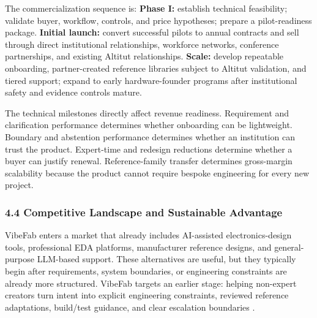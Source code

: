 \documentclass[11pt,letterpaper]{article}
\begin{document}
The commercialization sequence is: 
\textbf{Phase I:} establish technical feasibility; validate buyer, workflow, controls, and price hypotheses; prepare a pilot-readiness package.
\textbf{Initial launch:} convert successful pilots to annual contracts and sell through direct institutional relationships, workforce networks, conference partnerships, and existing Altitut relationships.
\textbf{Scale:} develop repeatable onboarding, partner-created reference libraries subject to Altitut validation, and tiered support; expand to early hardware-founder programs after institutional safety and evidence controls mature.

The technical milestones directly affect revenue readiness. Requirement and clarification performance determines whether onboarding can be lightweight. Boundary and abstention performance determines whether an institution can trust the product. Expert-time and redesign reductions determine whether a buyer can justify renewal. Reference-family transfer determines gross-margin scalability because the product cannot require bespoke engineering for every new project.

\subsubsection*{4.4 Competitive Landscape and Sustainable Advantage}

VibeFab enters a market that already includes AI-assisted electronics-design tools, professional EDA platforms, manufacturer reference designs, and general-purpose LLM-based support. These alternatives are useful, but they typically begin after requirements, system boundaries, or engineering constraints are already more structured. VibeFab targets an earlier stage: helping non-expert creators turn intent into explicit engineering constraints, reviewed reference adaptations, build/test guidance, and clear escalation boundaries \cite{flux2026,circuitmind2025,quilter2026,altium2025,cadence2025,siemens2026,siliconexpert2026}.
\end{document}
